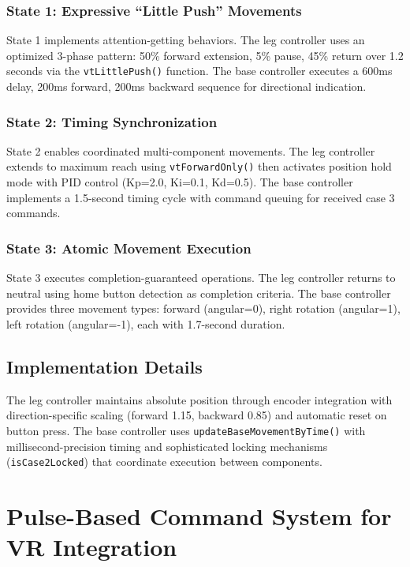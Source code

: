 \subsubsection{State 1: Expressive ``Little Push'' Movements}

State 1 implements attention-getting behaviors. The leg controller uses an optimized 3-phase pattern: 50\% forward extension, 5\% pause, 45\% return over 1.2 seconds via the \texttt{vtLittlePush()} function. The base controller executes a 600ms delay, 200ms forward, 200ms backward sequence for directional indication.

\subsubsection{State 2: Timing Synchronization}

State 2 enables coordinated multi-component movements. The leg controller extends to maximum reach using \texttt{vtForwardOnly()} then activates position hold mode with PID control (Kp=2.0, Ki=0.1, Kd=0.5). The base controller implements a 1.5-second timing cycle with command queuing for received case 3 commands.

\subsubsection{State 3: Atomic Movement Execution}

State 3 executes completion-guaranteed operations. The leg controller returns to neutral using home button detection as completion criteria. The base controller provides three movement types: forward (angular=0), right rotation (angular=1), left rotation (angular=-1), each with 1.7-second duration.

\subsection{Implementation Details}

The leg controller maintains absolute position through encoder integration with direction-specific scaling (forward 1.15, backward 0.85) and automatic reset on button press. The base controller uses \texttt{updateBaseMovementByTime()} with millisecond-precision timing and sophisticated locking mechanisms (\texttt{isCase2Locked}) that coordinate execution between components.

\section{Pulse-Based Command System for VR Integration}


